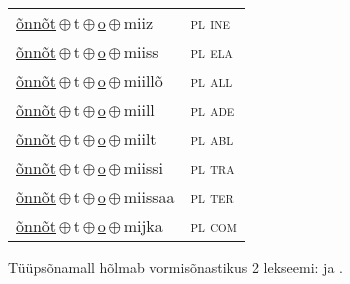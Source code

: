 \begin{minipage}{\textwidth}
\begin{sideways}
\begin{tabular}{l l}
\underline{õnnõt}\,$\oplus$\,t\,$\oplus$\,\underline{o}\,$\oplus$\,miiz & \textsc{ pl ine } \\
\underline{õnnõt}\,$\oplus$\,t\,$\oplus$\,\underline{o}\,$\oplus$\,miiss & \textsc{ pl ela } \\
\underline{õnnõt}\,$\oplus$\,t\,$\oplus$\,\underline{o}\,$\oplus$\,miillõ & \textsc{ pl all } \\
\underline{õnnõt}\,$\oplus$\,t\,$\oplus$\,\underline{o}\,$\oplus$\,miill & \textsc{ pl ade } \\
\underline{õnnõt}\,$\oplus$\,t\,$\oplus$\,\underline{o}\,$\oplus$\,miilt & \textsc{ pl abl } \\
\underline{õnnõt}\,$\oplus$\,t\,$\oplus$\,\underline{o}\,$\oplus$\,miissi & \textsc{ pl tra } \\
\underline{õnnõt}\,$\oplus$\,t\,$\oplus$\,\underline{o}\,$\oplus$\,miissaa & \textsc{ pl ter } \\
\underline{õnnõt}\,$\oplus$\,t\,$\oplus$\,\underline{o}\,$\oplus$\,mijka & \textsc{ pl com } \\
\end{tabular}
\end{sideways}
\label{tab:tüüpsõnamall-õnnõto}

\end{minipage}

 
\vspace{1em}
\noindent Tüüpsõnamall  hõlmab vormisõnastikus 2 lekseemi:  ja .
